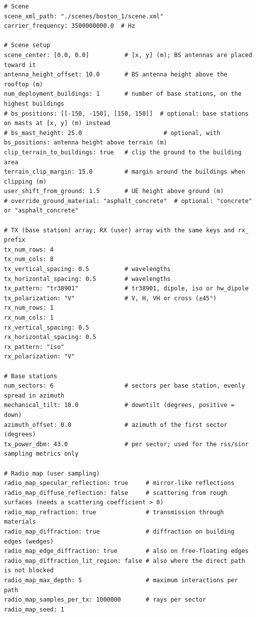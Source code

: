 \documentclass{article}
\begin{document}
\begin{verbatim}
# Scene
scene_xml_path: "./scenes/boston_1/scene.xml"
carrier_frequency: 3500000000.0  # Hz

# Scene setup
scene_center: [0.0, 0.0]          # [x, y] (m); BS antennas are placed toward it
antenna_height_offset: 10.0       # BS antenna height above the rooftop (m)
num_deployment_buildings: 1       # number of base stations, on the highest buildings
# bs_positions: [[-150, -150], [150, 150]]  # optional: base stations on masts at [x, y] (m) instead
# bs_mast_height: 25.0                       # optional, with bs_positions: antenna height above terrain (m)
clip_terrain_to_buildings: true   # clip the ground to the building area
terrain_clip_margin: 15.0         # margin around the buildings when clipping (m)
user_shift_from_ground: 1.5       # UE height above ground (m)
# override_ground_material: "asphalt_concrete"  # optional: "concrete" or "asphalt_concrete"

# TX (base station) array; RX (user) array with the same keys and rx_ prefix
tx_num_rows: 4
tx_num_cols: 8
tx_vertical_spacing: 0.5          # wavelengths
tx_horizontal_spacing: 0.5        # wavelengths
tx_pattern: "tr38901"             # tr38901, dipole, iso or hw_dipole
tx_polarization: "V"              # V, H, VH or cross (±45°)
rx_num_rows: 1
rx_num_cols: 1
rx_vertical_spacing: 0.5
rx_horizontal_spacing: 0.5
rx_pattern: "iso"
rx_polarization: "V"

# Base stations
num_sectors: 6                    # sectors per base station, evenly spread in azimuth
mechanical_tilt: 10.0             # downtilt (degrees, positive = down)
azimuth_offset: 0.0               # azimuth of the first sector (degrees)
tx_power_dbm: 43.0                # per sector; used for the rss/sinr sampling metrics only

# Radio map (user sampling)
radio_map_specular_reflection: true     # mirror-like reflections
radio_map_diffuse_reflection: false     # scattering from rough surfaces (needs a scattering coefficient > 0)
radio_map_refraction: true              # transmission through materials
radio_map_diffraction: true             # diffraction on building edges (wedges)
radio_map_edge_diffraction: true        # also on free-floating edges
radio_map_diffraction_lit_region: false # also where the direct path is not blocked
radio_map_max_depth: 5                  # maximum interactions per path
radio_map_samples_per_tx: 1000000       # rays per sector
radio_map_seed: 1


\end{verbatim}
\end{document}
